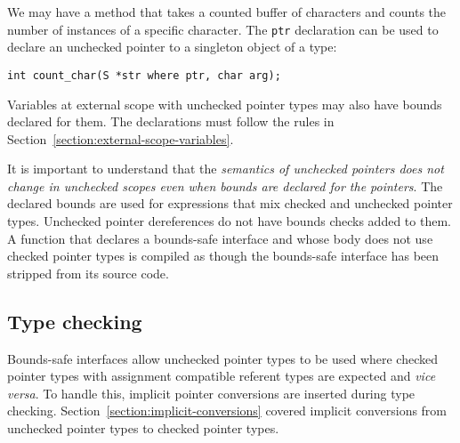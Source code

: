 We may have a method that takes a counted buffer of characters and
counts the number of instances of a specific character. The \texttt{ptr}
declaration can be used to declare an unchecked pointer to a singleton
object of a type:
\begin{verbatim}
int count_char(S *str where ptr, char arg);
\end{verbatim}

Variables at external scope with unchecked pointer types may also have
bounds declared for them.   The declarations must follow the 
rules in Section~\ref{section:external-scope-variables}.

It is important to understand that the \emph{semantics of unchecked
pointers does not change in unchecked scopes even when bounds are
declared for the pointers}. The declared bounds are used  for expressions
that mix checked and unchecked pointer types. Unchecked pointer dereferences do not
have bounds checks added to them. A function that declares a bounds-safe 
interface and whose body does not use checked pointer
types is compiled as though the bounds-safe interface has been
stripped from its source code.

\subsection{Type checking}

Bounds-safe interfaces allow unchecked pointer types to be used
where checked pointer types with assignment compatible referent types are
expected and {\it vice versa}.
To handle this, implicit pointer conversions are inserted during type checking.
Section~\ref{section:implicit-conversions} covered implicit conversions from unchecked pointer types to checked pointer types.

